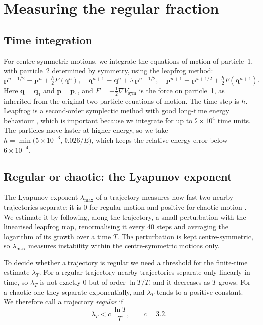 \documentclass[11pt,a4paper]{article}
\newcommand{\q}{\mathbf{q}}
\newcommand{\p}{\mathbf{p}}
\newcommand{\Vs}{V_{\mathrm{sym}}}
\begin{document}
\section{Measuring the regular fraction}\label{sec:methods}

\subsection{Time integration}
For centre-symmetric motions, we integrate the equations of motion
of particle~1, with particle~2 determined by symmetry, using the
leapfrog method:
\begin{equation}\label{eq:leapfrog}
  \p^{n+1/2}=\p^n+\tfrac h2 F(\q^n),\quad
  \q^{n+1}=\q^n+h\,\p^{n+1/2},\quad
  \p^{n+1}=\p^{n+1/2}+\tfrac h2 F(\q^{n+1}).
\end{equation}
Here $\q=\q_1$ and $\p=\p_1$, and
$F=-\frac12\nabla\Vs$ is the force on particle~1,
as inherited from the original two-particle equations of motion.
The time step is $h$. Leapfrog is a second-order symplectic method with good long-time energy behaviour \cite{hairer2006}, which is important because we integrate for up to
$2\times10^4$ time units. The particles move faster at higher energy, so we
take $h=\min\bigl(5\times10^{-3},\,0.026/E\bigr)$, which keeps the relative
energy error below $6\times10^{-4}$.

\subsection{Regular or chaotic: the Lyapunov exponent}\label{sec:lyap-method}
The Lyapunov exponent $\lambda_{\max}$ of a trajectory measures how fast two
nearby trajectories separate: it is $0$ for regular motion and positive for
chaotic motion \cite{lichtenberg1992}. We estimate it by following, along the trajectory, a small
perturbation with the linearised leapfrog map, renormalising it every 40 steps
and averaging the logarithm of its growth over a time $T$. The perturbation is
kept centre-symmetric, so $\lambda_{\max}$ measures instability within the
centre-symmetric motions only.

To decide whether a trajectory is regular we need a threshold for the
finite-time estimate $\lambda_T$. For a regular trajectory nearby trajectories
separate only linearly in time, so $\lambda_T$ is not exactly $0$ but of order
$\ln T/T$, and it decreases as $T$ grows. For a chaotic one they separate
exponentially, and $\lambda_T$ tends to a positive constant. We therefore call
a trajectory \emph{regular} if
\begin{equation}\label{eq:threshold}
  \lambda_T < c\,\frac{\ln T}{T},\qquad c=3.2 .
\end{equation}
\end{document}
